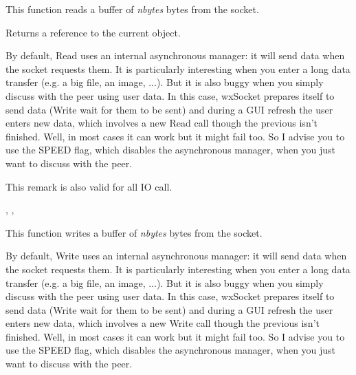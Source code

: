 %
%
\label{wxsocketbaseread}


This function reads a buffer of {\it nbytes} bytes from the socket.





Returns a reference to the current object.


By default, Read uses an internal asynchronous manager: it will send data when
the socket requests them. It is particularly interesting when you enter a long
data transfer (e.g. a big file, an image, ...). But it is also buggy when you
simply discuss with the peer using user data. In this case, wxSocket prepares
itself to send data (Write wait for them to be sent) and during a GUI refresh
the user enters new data, which involves a new Read call though the previous
isn't finished. Well, in most cases it can work but it might fail too.
So I advise you to use the SPEED flag, which disables the asynchronous manager,
when you just want to discuss with the peer.

This remark is also valid for all IO call.


,
 ,

%
%
\label{wxsocketbasewrite}


This function writes a buffer of {\it nbytes} bytes from the socket.


By default, Write uses an internal asynchronous manager: it will send data when
the socket requests them. It is particularly interesting when you enter a long
data transfer (e.g. a big file, an image, ...). But it is also buggy when you
simply discuss with the peer using user data. In this case, wxSocket prepares
itself to send data (Write wait for them to be sent) and during a GUI refresh
the user enters new data, which involves a new Write call though the previous
isn't finished. Well, in most cases it can work but it might fail too.  
So I advise you to use the SPEED flag, which disables the asynchronous manager,
when you just want to discuss with the peer.

